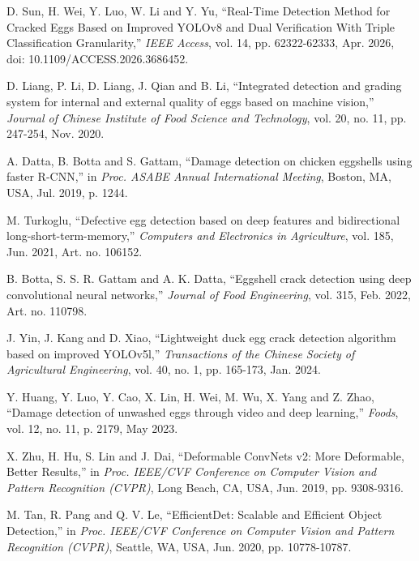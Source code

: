 \documentclass[12pt,a4paper]{report}
\begin{document}
\begin{enumerate}[label={[\arabic*]}]

\item D. Sun, H. Wei, Y. Luo, W. Li and Y. Yu,
``Real-Time Detection Method for Cracked Eggs Based on Improved YOLOv8 and Dual Verification With Triple Classification Granularity,''
\textit{IEEE Access}, vol. 14, pp. 62322-62333, Apr. 2026, doi: 10.1109/ACCESS.2026.3686452.

\item D. Liang, P. Li, D. Liang, J. Qian and B. Li,
``Integrated detection and grading system for internal and external quality of eggs based on machine vision,''
\textit{Journal of Chinese Institute of Food Science and Technology}, vol. 20, no. 11, pp. 247-254, Nov. 2020.

\item A. Datta, B. Botta and S. Gattam,
``Damage detection on chicken eggshells using faster R-CNN,''
in \textit{Proc. ASABE Annual International Meeting}, Boston, MA, USA, Jul. 2019, p. 1244.

\item M. Turkoglu,
``Defective egg detection based on deep features and bidirectional long-short-term-memory,''
\textit{Computers and Electronics in Agriculture}, vol. 185, Jun. 2021, Art. no. 106152.

\item B. Botta, S. S. R. Gattam and A. K. Datta,
``Eggshell crack detection using deep convolutional neural networks,''
\textit{Journal of Food Engineering}, vol. 315, Feb. 2022, Art. no. 110798.

\item J. Yin, J. Kang and D. Xiao,
``Lightweight duck egg crack detection algorithm based on improved YOLOv5l,''
\textit{Transactions of the Chinese Society of Agricultural Engineering}, vol. 40, no. 1, pp. 165-173, Jan. 2024.

\item Y. Huang, Y. Luo, Y. Cao, X. Lin, H. Wei, M. Wu, X. Yang and Z. Zhao,
``Damage detection of unwashed eggs through video and deep learning,''
\textit{Foods}, vol. 12, no. 11, p. 2179, May 2023.

\item X. Zhu, H. Hu, S. Lin and J. Dai,
``Deformable ConvNets v2: More Deformable, Better Results,''
in \textit{Proc. IEEE/CVF Conference on Computer Vision and Pattern Recognition (CVPR)}, Long Beach, CA, USA, Jun. 2019, pp. 9308-9316.

\item M. Tan, R. Pang and Q. V. Le,
``EfficientDet: Scalable and Efficient Object Detection,''
in \textit{Proc. IEEE/CVF Conference on Computer Vision and Pattern Recognition (CVPR)}, Seattle, WA, USA, Jun. 2020, pp. 10778-10787.


\end{enumerate}
\end{document}
